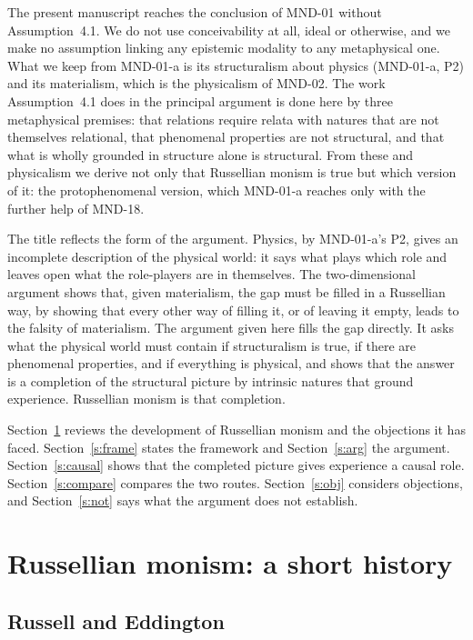 \documentclass{situationist-preprint}
\begin{document}
The present manuscript reaches the conclusion of MND-01 without Assumption~4.1. We do not use conceivability at all, ideal or otherwise, and we make no assumption linking any epistemic modality to any metaphysical one. What we keep from MND-01-a is its structuralism about physics (MND-01-a, P2) and its materialism, which is the physicalism of MND-02. The work Assumption~4.1 does in the principal argument is done here by three metaphysical premises: that relations require relata with natures that are not themselves relational, that phenomenal properties are not structural, and that what is wholly grounded in structure alone is structural. From these and physicalism we derive not only that Russellian monism is true but which version of it: the protophenomenal version, which MND-01-a reaches only with the further help of MND-18.

The title reflects the form of the argument. Physics, by MND-01-a's P2, gives an incomplete description of the physical world: it says what plays which role and leaves open what the role-players are in themselves. The two-dimensional argument shows that, given materialism, the gap must be filled in a Russellian way, by showing that every other way of filling it, or of leaving it empty, leads to the falsity of materialism. The argument given here fills the gap directly. It asks what the physical world must contain if structuralism is true, if there are phenomenal properties, and if everything is physical, and shows that the answer is a completion of the structural picture by intrinsic natures that ground experience. Russellian monism is that completion.

Section~\ref{s:history} reviews the development of Russellian monism and the objections it has faced. Section~\ref{s:frame} states the framework and Section~\ref{s:arg} the argument. Section~\ref{s:causal} shows that the completed picture gives experience a causal role. Section~\ref{s:compare} compares the two routes. Section~\ref{s:obj} considers objections, and Section~\ref{s:not} says what the argument does not establish.

\section{Russellian monism: a short history}\label{s:history}

\subsection{Russell and Eddington}
\end{document}
